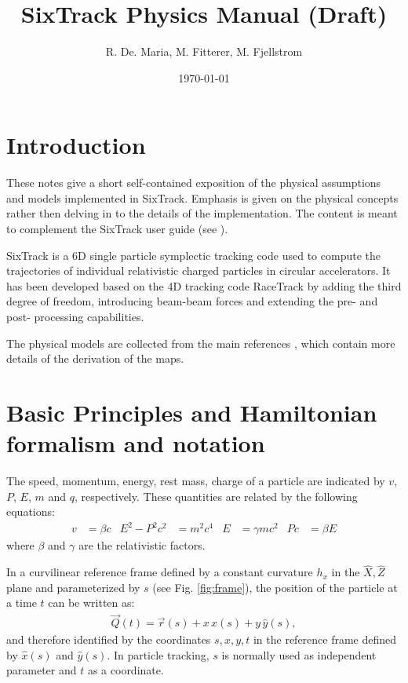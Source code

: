 \documentclass[english]{article}
\begin{document}
\author{R. De. Maria, M. Fitterer, M. Fjellstrom}
\title{SixTrack Physics Manual (Draft)}
\date{\today}

\maketitle

\tableofcontents
\newpage

\section{Introduction}

These notes give a short self-contained exposition of the physical assumptions
and models implemented in SixTrack. Emphasis is given on the physical concepts
rather then delving in to the details of the implementation.  The content is
meant to complement the SixTrack user guide (see \cite{user_guide}).

SixTrack is a 6D single particle symplectic tracking code used to compute the
trajectories of individual relativistic charged particles in circular
accelerators. It has been developed based on the 4D tracking code RaceTrack
\cite{racetrack} by adding the third degree of freedom, introducing beam-beam
forces and extending the pre- and post- processing capabilities.

The physical models are collected from the main references
\cite{ripken85,barber87,ripken95,heinemann95,barber96,beam_beam,rf_multipoles},
which contain more details of the derivation of the maps.

\section{Basic Principles and Hamiltonian formalism and notation}


The speed, momentum, energy, rest mass, charge of a particle are indicated
by $v$, $P$, $E$, $m$ and $q$, respectively.  These quantities are
related by the following equations:
\begin{align}
  v&=\beta c &
  E^2-P^2c^2&=m^2c^4 &
  E & = \gamma mc^2 &
  Pc & =\beta E
\end{align}
where $\beta$ and $\gamma$ are the relativistic factors.

In a curvilinear reference frame defined by a constant curvature $h_x$ in the
$\hat X, \hat Z$ plane and parameterized by $s$  (see Fig. \ref{fig:frame}), the
position of the particle at a time $t$ can be written as:
\begin{align}
  \vec Q(t)= \vec r(s) + x \,\hat x(s) + y\, \hat y(s),
\end{align}
and therefore identified by the coordinates $s, x, y, t$ in the reference frame
defined by $\hat x(s)$ and $\hat y(s)$. In particle tracking, $s$ is normally
used as independent parameter and $t$ as a coordinate.
\end{document}
